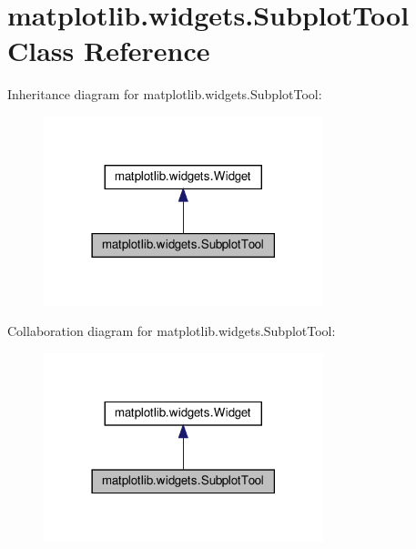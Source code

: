 \hypertarget{classmatplotlib_1_1widgets_1_1SubplotTool}{}\section{matplotlib.\+widgets.\+Subplot\+Tool Class Reference}
\label{classmatplotlib_1_1widgets_1_1SubplotTool}


Inheritance diagram for matplotlib.\+widgets.\+Subplot\+Tool\+:
\nopagebreak
\begin{figure}[H]
\begin{center}
\leavevmode
\includegraphics[width=230pt]{classmatplotlib_1_1widgets_1_1SubplotTool__inherit__graph}
\end{center}
\end{figure}


Collaboration diagram for matplotlib.\+widgets.\+Subplot\+Tool\+:
\nopagebreak
\begin{figure}[H]
\begin{center}
\leavevmode
\includegraphics[width=230pt]{classmatplotlib_1_1widgets_1_1SubplotTool__coll__graph}
\end{center}
\end{figure}
